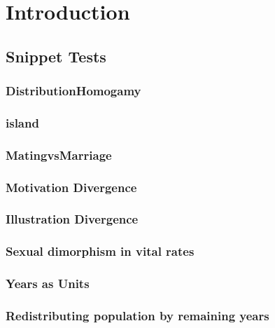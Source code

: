 \startthechapters 
 \chapter{Introduction}
 \label{chap:Intro}
 
 

 \section{Snippet Tests}
 
\subsection{DistributionHomogamy}
 
 
\subsection{island}
 
 
\subsection{MatingvsMarriage}
 
  
\subsection{Motivation Divergence} 
 
 
\subsection{Illustration Divergence} 
 
 
\subsection{Sexual dimorphism in vital rates} 
 

\subsection{Years as Units}


\subsection{Redistributing population by remaining years}


